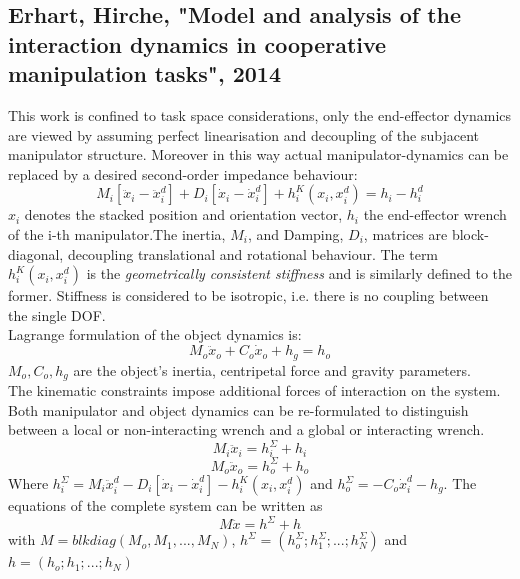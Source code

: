 \documentclass[conference]{IEEEtran}
\begin{document}

\subsection{Erhart, Hirche, "Model and analysis of the interaction dynamics in cooperative manipulation tasks", 2014}
This work is confined to task space considerations, only the end-effector dynamics are viewed by assuming perfect linearisation and decoupling of the subjacent manipulator structure. Moreover in this way actual manipulator-dynamics can be replaced by a desired second-order impedance behaviour:
\begin{equation}
M_i[\ddot{x}_i - \ddot{x}_i^d] + D_i[\dot{x}_i - \dot{x}_i^d] + h_i^K(x_i,x_i^d) = h_i - h_i^d
\end{equation}
$ x_i $ denotes the stacked position and orientation vector, $ h_i $ the end-effector wrench of the i-th manipulator.The inertia, $ M_i $, and Damping, $ D_i $, matrices are block-diagonal, decoupling translational and rotational behaviour. The term $ h_i^K(x_i,x_i^d) $ is the \textit{geometrically consistent stiffness} and is similarly defined to the former. Stiffness is considered to be isotropic, i.e. there is no coupling between the single DOF. \\
Lagrange formulation of the object dynamics is:
\begin{equation}
M_o \ddot{x}_o + C_o\dot{x}_o + h_g = h_o
\end{equation}
$ M_o, C_o, h_g $ are the object's inertia, centripetal force and gravity parameters. \\
The kinematic constraints impose additional forces of interaction on the system. Both manipulator and object dynamics can be re-formulated to distinguish between a local or non-interacting wrench and a global or interacting wrench. 
\begin{equation}
	M_i \ddot{x}_i  = h_i^\Sigma + h_i
\end{equation}
\begin{equation}
M_o \ddot{x}_o  = h_o^\Sigma + h_o
\end{equation}
Where $ h_i^\Sigma = M_i\ddot{x}_i^d - D_i[\dot{x}_i - \dot{x}_i^d] - h_i^K(x_i,x_i^d) $ and  $ h_o^\Sigma = -C_o\dot{x}_i^d - h_g $. The equations of the complete system can be written as
\begin{equation}
M \ddot{x} = h^\Sigma + h
\end{equation}
with $ M = blkdiag(M_o,M_1,...,M_N) $, $ h^\Sigma = (h_o^\Sigma;h_1^\Sigma;...;h_N^\Sigma) $ and $ h = (h_o;h_1;...;h_N) $
\end{document}
